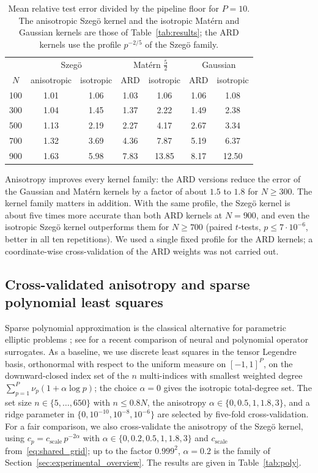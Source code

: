 \documentclass[11pt]{article}
\numberwithin{equation}{section}
\theoremstyle{plain}
\theoremstyle{definition}
\theoremstyle{remark}
\begin{document}
\begin{table}[htbp]
\centering
\begin{tabular}{c|cc|cc|cc}
\toprule
 & \multicolumn{2}{c|}{Szegö} & \multicolumn{2}{c|}{Matérn $\tfrac52$} & \multicolumn{2}{c}{Gaussian}\\
$N$ & anisotropic & isotropic & ARD & isotropic & ARD & isotropic\\
\midrule
100 & 1.01 & 1.06 & 1.03 & 1.06 & 1.06 & 1.08\\
300 & 1.04 & 1.45 & 1.37 & 2.22 & 1.49 & 2.38\\
500 & 1.13 & 2.19 & 2.27 & 4.17 & 2.67 & 3.34\\
700 & 1.32 & 3.69 & 4.36 & 7.87 & 5.19 & 6.37\\
900 & 1.63 & 5.98 & 7.83 & 13.85 & 8.17 & 12.50\\
\bottomrule
\end{tabular}
\caption{Mean relative test error divided by the pipeline floor for $P=10$. The anisotropic
Szegö kernel and the isotropic Matérn and Gaussian kernels are those of
Table~\ref{tab:results}; the ARD kernels use the profile $p^{-2/5}$ of the Szegö family.}
\label{tab:ard}
\end{table}

Anisotropy improves every kernel family: the ARD versions reduce the error of the Gaussian
and Matérn kernels by a factor of about $1.5$ to $1.8$ for $N\geq300$. The kernel family
matters in addition. With the same profile, the Szegö kernel is about five times more
accurate than both ARD kernels at $N=900$, and even the isotropic Szegö kernel outperforms
them for $N\geq700$ (paired $t$-tests, $p\leq7\cdot10^{-6}$, better in all ten
repetitions). We used a single fixed profile for the ARD kernels; a coordinate-wise
cross-validation of the ARD weights was not carried out.

\subsection{Cross-validated anisotropy and sparse polynomial least squares}

Sparse polynomial approximation is the classical alternative for parametric elliptic
problems \cite{cohen2010convergence,cohen2011analytic}; see \cite{westermann2026performance}
for a recent comparison of neural and polynomial operator surrogates. As a baseline, we use discrete least
squares in the tensor Legendre basis, orthonormal with respect to the uniform measure on
$[-1,1]^P$, on the downward-closed index set of the $n$ multi-indices with smallest
weighted degree $\sum_{p=1}^P\nu_p(1+\alpha\log p)$; the choice $\alpha=0$ gives the
isotropic total-degree set. The set size $n\in\{5,\dots,650\}$ with $n\leq0.8N$, the
anisotropy $\alpha\in\{0,0.5,1,1.8,3\}$, and a ridge parameter in
$\{0,10^{-10},10^{-8},10^{-6}\}$ are selected by five-fold cross-validation. For a fair
comparison, we also cross-validate the anisotropy of the Szegö kernel, using
$c_p=c_{\mathrm{scale}}\,p^{-2\alpha}$ with $\alpha\in\{0,0.2,0.5,1,1.8,3\}$ and
$c_{\mathrm{scale}}$ from~\eqref{eq:shared_grid}; up to the factor $0.999^2$, $\alpha=0.2$
is the family of Section~\ref{sec:experimental_overview}. The results are given in
Table~\ref{tab:poly}.
\end{document}
